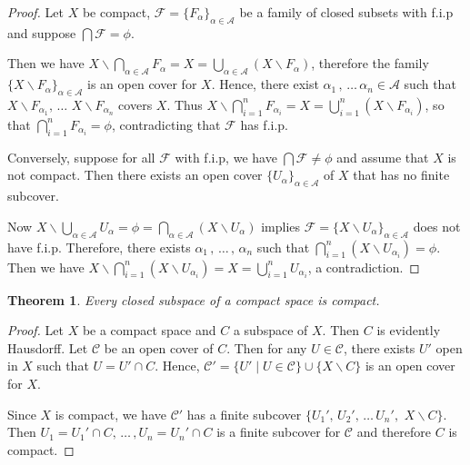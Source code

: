 \documentclass[12pt,oneside,english]{amsbook}
\numberwithin{equation}{section} %
\numberwithin{figure}{section} %
\theoremstyle{plain}
\numberwithin{section}{chapter}
\newtheorem{thm}{Theorem}[section]
\theoremstyle{plain}
\begin{document}
\begin{proof}
  Let $X$ be compact, $\mathcal{F}  =  \{F_{\alpha}\}_{\alpha \in \mathcal{A}}$ be a family of closed subsets with f.i.p and suppose $\bigcap \mathcal{F} = \phi$.

  Then we have $X \backslash \bigcap_{\alpha \in \mathcal{A}} F_{\alpha} = X = \bigcup_{\alpha  \in  \mathcal{A}}(X \backslash F_{\alpha})$, therefore the family $\{X \backslash F_{\alpha} \}_{\alpha \in \mathcal{A}}$ is an open cover for $X$. Hence, there exist $\alpha_{1} \, , \, \ldots \, \alpha_{n} \in \mathcal{A}$ such that $X \backslash F_{\alpha_{1}}, \, \ldots $ $ X \backslash F_{\alpha_{n}}$ covers $X$. Thus $X \backslash \bigcap_{i  =  1}^{n}F_{\alpha_{i}}  =  X  =  \bigcup_{i  =  1}^{n}(X \backslash F_{\alpha_{i}})$, so that $\bigcap_{i =  1}^{n}F_{\alpha_{i}}  = \phi$, contradicting that $\mathcal{F}$ has f.i.p.

  Conversely, suppose for all $\mathcal{F}$ with f.i.p, we have $\bigcap \mathcal{F} \neq \phi$ and assume that $X$ is not compact. Then there exists an open cover $\{U_{\alpha}\}_{\alpha  \in  \mathcal{A}}$  of $X$ that has no finite subcover.

  Now $X \backslash \bigcup_{\alpha \in \mathcal{A}}U_{\alpha}  =  \phi  =  \bigcap_{\alpha  \in  \mathcal{A}}(X \backslash U_{\alpha})$ implies $\mathcal{F}  =  \{X \backslash U_{\alpha} \}_{\alpha \in \mathcal{A}}$ does not have f.i.p. Therefore, there exists $\alpha_{1}\, , \, \ldots \, , \, \alpha_{n}$ such that $\bigcap_{i =  1}^{n}(X \backslash U_{\alpha_{i}})  =  \phi$. Then we have $X \backslash \bigcap_{i = 1}^n(X \backslash U_{\alpha_{i}})  =  X  =  \bigcup_{i  =  1}^{n} U_{\alpha_{i}}$, a contradiction.
\end{proof}

\begin{thm}
  Every closed subspace of a compact space is compact.
\end{thm}
\begin{proof}
  Let $X$ be a compact space and $C$ a subspace of $X$. Then $C$ is evidently Hausdorff. Let $\mathcal{C}$ be an open cover of $C$. Then for any $U  \in  \mathcal{C}$, there exists $U'$ open in $X$ such that $U  =  U' \cap C$. Hence, $\mathcal{C}'  =  \{U' \; | \; U \in \mathcal{C} \}\cup \{X \backslash C \}$ is an open cover for $X$.

  Since $X$ is compact, we have  $\mathcal{C}'$ has a finite subcover $\{U_{1}', \, U_{2}', \, \ldots \, U_{n}',$ $ X \backslash C \}$. Then $ U_1  =  U_{1}' \cap C, \, \ldots  \, , U_{n}  =  U_{n}'\cap C $ is a finite subcover for $\mathcal{C}$ and therefore $C$ is compact.
\end{proof}
\end{document}
